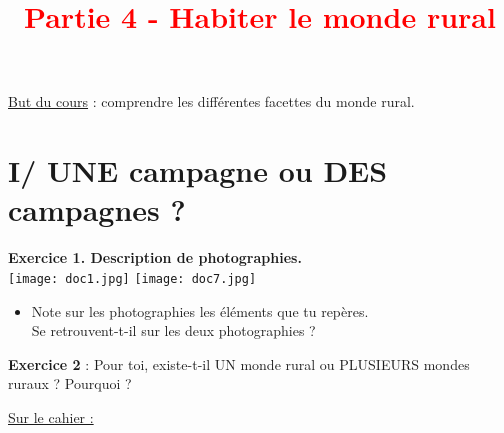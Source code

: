 \documentclass{beamer}
\title{{\textcolor{red}{Partie 4 - Habiter le monde rural}}}
\begin{document}
\begin{frame}
 \titlepage %
 \end{frame}

\begin{frame}
\underline{But du cours} : comprendre les différentes facettes du monde rural.
\end{frame}
 
 \begin{frame}
 \tableofcontents
 \end{frame}
 

 
 \section{I/ UNE campagne ou DES campagnes ?}
 
 \begin{frame}
\textbf{Exercice 1. Description de photographies.}\\

\texttt{[image: doc1.jpg]}
\texttt{[image: doc7.jpg]}

  \begin{itemize}
  \item Note sur les photographies les éléments que tu repères. \\
  Se retrouvent-t-il sur les deux photographies ?
  \end{itemize}
\end{frame}


 
\begin{frame}
\textbf{Exercice 2} : Pour toi, existe-t-il UN monde rural ou PLUSIEURS mondes ruraux ? Pourquoi ?
\textcolor{black!70!green}{}
\end{frame}
 
 \begin{frame} \underline{ Sur le cahier : } 
 
 \textcolor{blue}{}
 
 
 
 \end{frame}
\end{document}
